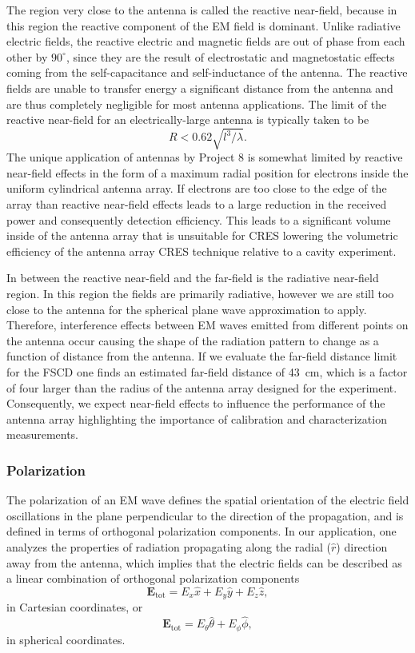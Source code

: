 The region very close to the antenna is called the reactive near-field, because in this region the reactive component of the EM field is dominant. Unlike radiative electric fields, the reactive electric and magnetic fields are out of phase from each other by $90^\circ$, since they are the result of electrostatic and magnetostatic effects coming from the self-capacitance and self-inductance of the antenna. The reactive fields are unable to transfer energy a significant distance from the antenna and are thus completely negligible for most antenna applications. The limit of the reactive near-field for an electrically-large antenna is typically taken to be
\begin{equation}
    R<0.62\sqrt{l^3/\lambda}.
\end{equation}
The unique application of antennas by Project 8 is somewhat limited by reactive near-field effects in the form of a maximum radial position for electrons inside the uniform cylindrical antenna array. If electrons are too close to the edge of the array than reactive near-field effects leads to a large reduction in the received power and consequently detection efficiency. This leads to a significant volume inside of the antenna array that is unsuitable for CRES lowering the volumetric efficiency of the antenna array CRES technique relative to a cavity experiment.

In between the reactive near-field and the far-field is the radiative near-field region. In this region the fields are primarily radiative, however we are still too close to the antenna for the spherical plane wave approximation to apply. Therefore, interference effects between EM waves emitted from different points on the antenna occur causing the shape of the radiation pattern to change as a function of distance from the antenna. If we evaluate the far-field distance limit for the FSCD one finds an estimated far-field distance of 43~cm, which is a factor of four larger than the radius of the antenna array designed for the experiment. Consequently, we expect near-field effects to influence the performance of the antenna array highlighting the importance of calibration and characterization measurements.

\subsubsection{Polarization}
The polarization of an EM wave defines the spatial orientation of the electric field oscillations in the plane perpendicular to the direction of the propagation, and is defined in terms of orthogonal polarization components. In our application, one analyzes the properties of radiation propagating along the radial ($\hat{r}$) direction away from the antenna, which implies that the electric fields can be described as a linear combination of orthogonal polarization components
\begin{equation}
    \mathbf{E}_\mathrm{tot}=E_x\hat{x}+E_y\hat{y}+E_z\hat{z},
\end{equation}
in Cartesian coordinates, or
\begin{equation}
    \mathbf{E}_\mathrm{tot}=E_\theta\hat{\theta}+E_\phi\hat{\phi},
\end{equation}
in spherical coordinates. 

